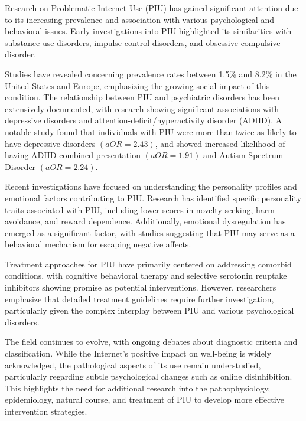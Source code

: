\documentclass[11pt]{extarticle}
\begin{document}
\begin{mdframed}
    Research on Problematic Internet Use (PIU) has gained significant attention due to its increasing prevalence and association with various psychological and behavioral issues. Early investigations into PIU highlighted its similarities with substance use disorders, impulse control disorders, and obsessive-compulsive disorder.
    
    Studies have revealed concerning prevalence rates between 1.5\% and 8.2\% in the United States and Europe, emphasizing the growing social impact of this condition. 
    The relationship between PIU and psychiatric disorders has been extensively documented, with research showing significant associations with depressive disorders and attention-deficit/hyperactivity disorder (ADHD). 
    A notable study found that individuals with PIU were more than twice as likely to have depressive disorders $(aOR = 2.43)$, and showed increased likelihood of having ADHD combined presentation $(aOR = 1.91)$ and Autism Spectrum Disorder $(aOR = 2.24)$.
    
    Recent investigations have focused on understanding the personality profiles and emotional factors contributing to PIU. Research has identified specific personality traits associated with PIU, including lower scores in novelty seeking, harm avoidance, and reward dependence. 
    Additionally, emotional dysregulation has emerged as a significant factor, with studies suggesting that PIU may serve as a behavioral mechanism for escaping negative affects.
    
    Treatment approaches for PIU have primarily centered on addressing comorbid conditions, with cognitive behavioral therapy and selective serotonin reuptake inhibitors showing promise as potential interventions.
    However, researchers emphasize that detailed treatment guidelines require further investigation, particularly given the complex interplay between PIU and various psychological disorders.
    
    The field continues to evolve, with ongoing debates about diagnostic criteria and classification. While the Internet's positive impact on well-being is widely acknowledged, the pathological aspects of its use remain understudied, particularly regarding subtle psychological changes such as online disinhibition. 
    This highlights the need for additional research into the pathophysiology, epidemiology, natural course, and treatment of PIU to develop more effective intervention strategies.
\end{mdframed}
\end{document}
